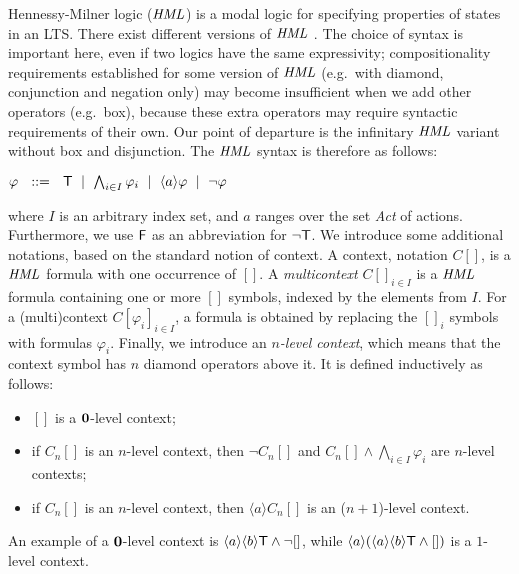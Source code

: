 \documentclass{eptcs}
\def\hml{{\it HML}}
\def\true{{\sf T}}
\def\false{{\sf F}}
\newcommand{\diam}[1]{\langle#1\rangle}
\begin{document}
Hennessy-Milner logic ($\hml$) \cite{HeMi85} is a modal logic for specifying properties of states in an LTS.
There exist different versions of $\hml$ \cite{HeMi85,Gla01,BlRiVe01}. The choice of syntax is important here,
even if two logics have the same expressivity; compositionality requirements established for some version of $\hml$
(e.g.\ with diamond, conjunction and negation only) may become insufficient when we add other operators
(e.g.\ box), because these extra operators may require syntactic requirements of their own.
Our point of departure is the infinitary $\hml$ variant without box and disjunction. The $\hml$ syntax is therefore as follows:
\begin{center}
$
\varphi ~~::=~~ \true ~\mid~ \bigwedge_{i\in I}\varphi_i ~\mid~ \diam{a}\varphi ~\mid~ \neg\varphi
$
\end{center}
where $I$ is an arbitrary index set, and $a$ ranges over the set {\it Act} of actions.
Furthermore, we use $\false$ as an abbreviation for $\neg\true$. We introduce some additional notations, based on the standard notion of context. A context, notation $C[]$, is a $\hml$ formula with one occurrence of $[]$. A \textit{multicontext $C[]_{i \in I}$} is a $\hml$ formula containing one or more $[]$ symbols, indexed by the elements from $I$. For a (multi)context $C[\varphi_i]_{i \in I}$, a formula is obtained by replacing the $[]_i$ symbols with formulas $\varphi_i$.
Finally, we introduce an \textit{$n$-level context}, which means that the context symbol has $n$ diamond operators above it. It is defined inductively as follows:
 \begin{itemize}
 \item $[]$ is a ${\bf 0}$-level context;
 \item if $C_{n}[]$ is an $n$-level context, then $\neg C_{n}[]$ and $C_{n}[] \wedge \bigwedge_{i \in I} \varphi_i$ are $n$-level contexts;
 \item if $C_{n}[]$ is an $n$-level context, then $\diam{a}C_{n}[]$ is an ($n+1$)-level context.
 \end{itemize}
An example of a ${\bf 0}$-level context is $\diam{a}\diam{b} \true \wedge \neg []$, while $\diam{a} (\diam{a}\diam{b} \true \wedge [])$ is a $1$-level context.
\end{document}
